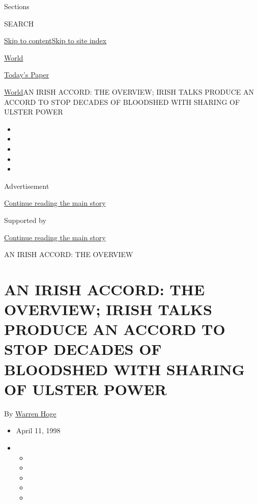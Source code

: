 Sections

SEARCH

\protect\hyperlink{site-content}{Skip to
content}\protect\hyperlink{site-index}{Skip to site index}

\href{https://www.nytimes.com/section/world}{World}

\href{https://myaccount.nytimes.com/auth/login?response_type=cookie\&client_id=vi}{}

\href{https://www.nytimes.com/section/todayspaper}{Today's Paper}

\href{/section/world}{World}\textbar{}AN IRISH ACCORD: THE OVERVIEW;
IRISH TALKS PRODUCE AN ACCORD TO STOP DECADES OF BLOODSHED WITH SHARING
OF ULSTER POWER

\begin{itemize}
\item
\item
\item
\item
\item
\end{itemize}

Advertisement

\protect\hyperlink{after-top}{Continue reading the main story}

Supported by

\protect\hyperlink{after-sponsor}{Continue reading the main story}

AN IRISH ACCORD: THE OVERVIEW

\hypertarget{an-irish-accord-the-overview-irish-talks-produce-an-accord-to-stop-decades-of-bloodshed-with-sharing-of-ulster-power}{%
\section{AN IRISH ACCORD: THE OVERVIEW; IRISH TALKS PRODUCE AN ACCORD TO
STOP DECADES OF BLOODSHED WITH SHARING OF ULSTER
POWER}\label{an-irish-accord-the-overview-irish-talks-produce-an-accord-to-stop-decades-of-bloodshed-with-sharing-of-ulster-power}}

By \href{https://www.nytimes.com/by/warren-hoge}{Warren Hoge}

\begin{itemize}
\item
  April 11, 1998
\item
  \begin{itemize}
  \item
  \item
  \item
  \item
  \item
  \end{itemize}
\end{itemize}

